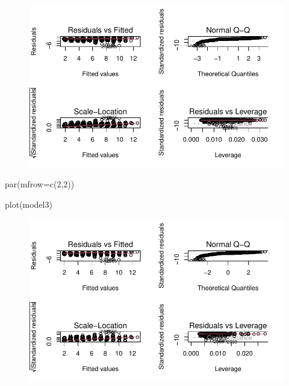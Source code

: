 \documentclass[
  letterpaper,
  DIV=11,
  numbers=noendperiod]{scrartcl}
\newenvironment{Shaded}{\begin{snugshade}}{\end{snugshade}}
\newcommand{\AttributeTok}[1]{\textcolor[rgb]{0.40,0.45,0.13}{#1}}
\newcommand{\DecValTok}[1]{\textcolor[rgb]{0.68,0.00,0.00}{#1}}
\newcommand{\FunctionTok}[1]{\textcolor[rgb]{0.28,0.35,0.67}{#1}}
\newcommand{\NormalTok}[1]{\textcolor[rgb]{0.00,0.23,0.31}{#1}}
\begin{document}
\begin{figure}[H]

{\centering \includegraphics{Fertility_Rates_Education_Impact_Botswana_files/figure-pdf/unnamed-chunk-46-1.pdf}

}

\end{figure}

\begin{Shaded}
\begin{Highlighting}[]
\FunctionTok{par}\NormalTok{(}\AttributeTok{mfrow=}\FunctionTok{c}\NormalTok{(}\DecValTok{2}\NormalTok{,}\DecValTok{2}\NormalTok{)) }

\FunctionTok{plot}\NormalTok{(model3)}
\end{Highlighting}
\end{Shaded}

\begin{figure}[H]

{\centering \includegraphics{Fertility_Rates_Education_Impact_Botswana_files/figure-pdf/unnamed-chunk-47-1.pdf}

}

\end{figure}
\end{document}
